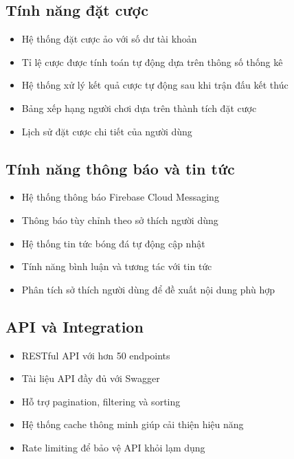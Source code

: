 \documentclass[a4paper,12pt]{report}
\begin{document}
\subsection{Tính năng đặt cược}

\begin{itemize}
    \item Hệ thống đặt cược ảo với số dư tài khoản
    \item Tỉ lệ cược được tính toán tự động dựa trên thông số thống kê
    \item Hệ thống xử lý kết quả cược tự động sau khi trận đấu kết thúc
    \item Bảng xếp hạng người chơi dựa trên thành tích đặt cược
    \item Lịch sử đặt cược chi tiết của người dùng
\end{itemize}

\subsection{Tính năng thông báo và tin tức}

\begin{itemize}
    \item Hệ thống thông báo Firebase Cloud Messaging
    \item Thông báo tùy chỉnh theo sở thích người dùng
    \item Hệ thống tin tức bóng đá tự động cập nhật
    \item Tính năng bình luận và tương tác với tin tức
    \item Phân tích sở thích người dùng để đề xuất nội dung phù hợp
\end{itemize}

\subsection{API và Integration}

\begin{itemize}
    \item RESTful API với hơn 50 endpoints
    \item Tài liệu API đầy đủ với Swagger
    \item Hỗ trợ pagination, filtering và sorting
    \item Hệ thống cache thông minh giúp cải thiện hiệu năng
    \item Rate limiting để bảo vệ API khỏi lạm dụng
\end{itemize}
\end{document}
